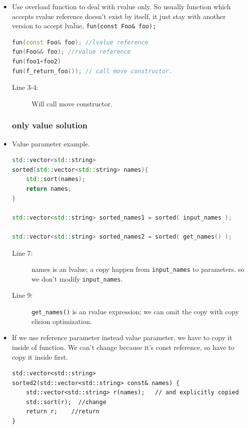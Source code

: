 \documentclass[a4paper,11pt,twoside]{book}
\begin{document}
\begin{itemize}
\item Use overload function to deal with rvalue only. So usually function which accepts rvalue reference doesn't exist by itself, it just stay with another version to accept lvalue, \texttt{fun(const Foo\& foo);}
\begin{lstlisting}[frame=single, language=c++]
fun(const Foo& foo); //lvalue reference
fun(Foo&& foo); //rvalue reference
fun(foo1+foo2) 
fun(f_return_foo()); // call move constructor.
\end{lstlisting}
\begin{description}
	\item[Line 3-4:] Will call move constructor.
\end{description}

\subsubsection{only value solution}

\item Value parameter example.

\begin{lstlisting}[frame=single, language=c++]
std::vector<std::string> 
sorted(std::vector<std::string> names){
	std::sort(names);
	return names;
}

std::vector<std::string> sorted_names1 = sorted( input_names );

std::vector<std::string> sorted_names2 = sorted( get_names() );
\end{lstlisting}
\begin{description}
	\item[Line 7:] names is an lvalue; a copy happen from \texttt{input\_names} to parameters. so we don't modify \texttt{input\_names}.

	\item[Line 9:] \texttt{get\_names()} is an rvalue expression; we can omit the copy with copy elision optimization.

\end{description}

\item If we use reference parameter instead value parameter, we have to copy it inside of function. We can't change because it's const reference, so have to copy it inside first. 

\begin{lstlisting}[numbers=none]
std::vector<std::string> 
sorted2(std::vector<std::string> const& names) {
	std::vector<std::string> r(names);   // and explicitly copied
	std::sort(r);  //change
	return r;    //return
}
\end{lstlisting}




\end{itemize}
\end{document}
